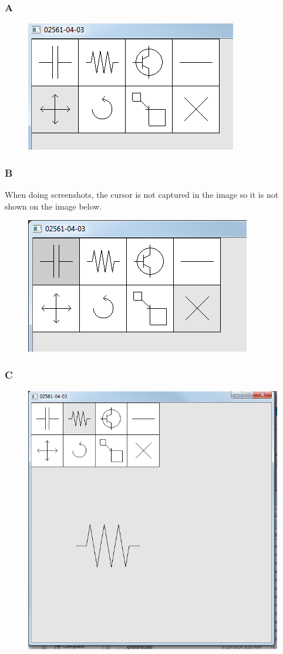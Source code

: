 \documentclass[11pt]{article}
\begin{document}
\subsubsection{A}
\begin{figure}[H]
	\centering
	\includegraphics[width=0.5\linewidth]{images/e05p3a}
	\label{fig:e05p3a}
\end{figure}

\subsubsection{B}
When doing screenshots, the cursor is not captured in the image so it is not shown on the image below.
\begin{figure}[H]
	\centering
	\includegraphics[width=0.5\linewidth]{images/e05p3b}
	\label{fig:e05p3b}
\end{figure}

\subsubsection{C}
\begin{figure}[H]
	\centering
	\includegraphics[width=0.5\linewidth]{images/e05p3c}
	\label{fig:e05p3c}
\end{figure}
\end{document}
